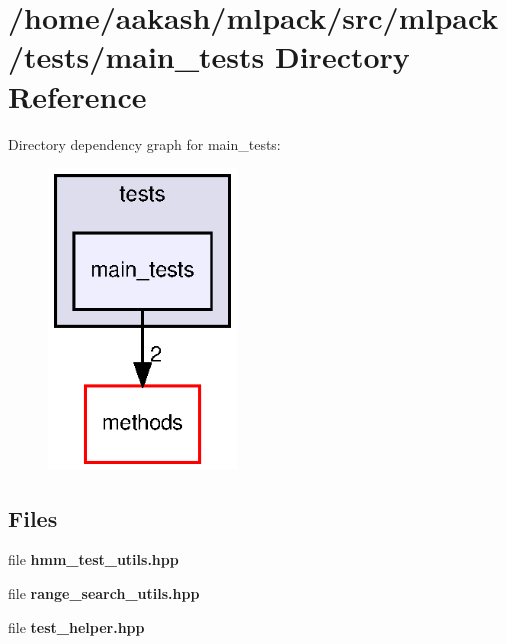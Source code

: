 \section{/home/aakash/mlpack/src/mlpack/tests/main\+\_\+tests Directory Reference}
\label{dir_9b9b1e5031378e19eee8e87fed05a7c8}
Directory dependency graph for main\+\_\+tests\+:
\nopagebreak
\begin{figure}[H]
\begin{center}
\leavevmode
\includegraphics[width=142pt]{dir_9b9b1e5031378e19eee8e87fed05a7c8_dep}
\end{center}
\end{figure}
\subsection*{Files}
\begin{DoxyCompactItemize}
\item 
file \textbf{ hmm\+\_\+test\+\_\+utils.\+hpp}
\item 
file \textbf{ range\+\_\+search\+\_\+utils.\+hpp}
\item 
file \textbf{ test\+\_\+helper.\+hpp}
\end{DoxyCompactItemize}
